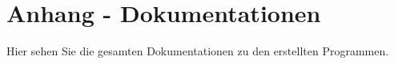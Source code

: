 \chapter{Anhang - Dokumentationen}
Hier sehen Sie die gesamten Dokumentationen zu den erstellten Programmen.




\cleardoublepage